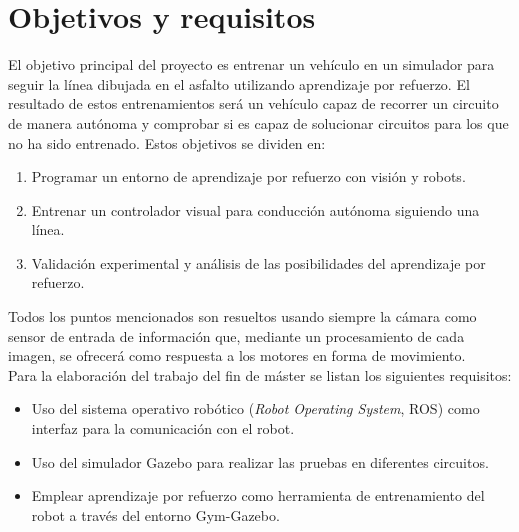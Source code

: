 \section{Objetivos y requisitos}\label{objetivos}

El objetivo principal del proyecto es entrenar un vehículo en un simulador para seguir la línea dibujada en el asfalto utilizando aprendizaje por refuerzo. El resultado de estos entrenamientos será un vehículo capaz de recorrer un circuito de manera autónoma y comprobar si es capaz de solucionar circuitos para los que no ha sido entrenado. Estos objetivos se dividen en:\\

\begin{enumerate}
    \item Programar un entorno de aprendizaje por refuerzo con visión y robots.\\
    \item Entrenar un controlador visual para conducción autónoma siguiendo una línea.\\
    \item Validación experimental y análisis de las posibilidades del aprendizaje por refuerzo.\\
\end{enumerate}

Todos los puntos mencionados son resueltos usando siempre la cámara como sensor de entrada de información que, mediante un procesamiento de cada imagen, se ofrecerá como respuesta a los motores en forma de movimiento.\\

Para la elaboración del trabajo del fin de máster se listan los siguientes requisitos:\\

\begin{itemize}
    \item Uso del sistema operativo robótico (\textit{Robot Operating System}, ROS) como interfaz para la comunicación con el robot.
    \item Uso del simulador Gazebo para realizar las pruebas en diferentes circuitos.
    \item Emplear aprendizaje por refuerzo como herramienta de entrenamiento del robot a través del entorno Gym-Gazebo.
\end{itemize}



